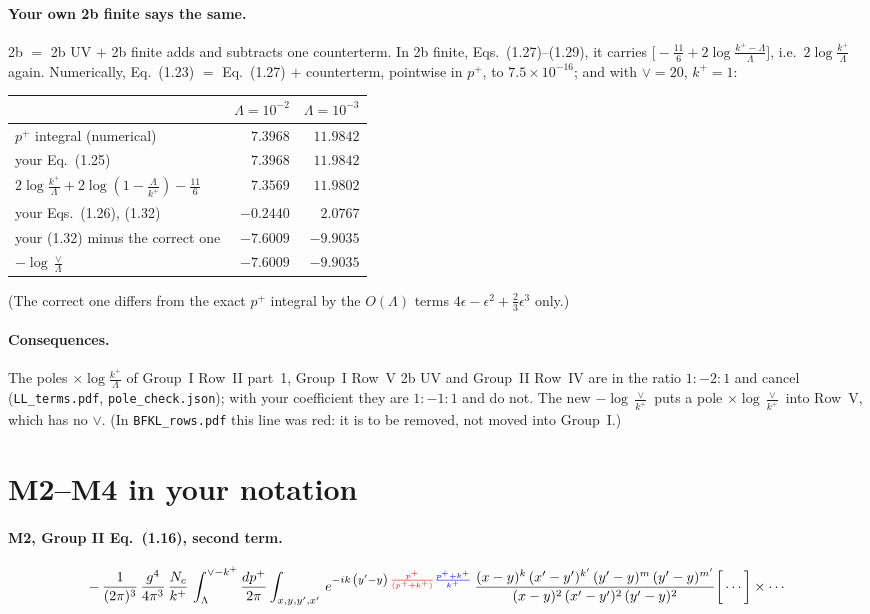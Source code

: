 \documentclass[10pt]{article}
\newcommand{\new}[1]{{\color{blue}#1}}
\newcommand{\old}[1]{{\color{red}#1}}
\begin{document}
\paragraph{Your own 2b finite says the same.} 2b $=$ 2b UV $+$ 2b finite adds and subtracts one counterterm. In 2b finite, Eqs.~(1.27)--(1.29), it carries $\big[-\frac{11}{6}+2\log\frac{k^+-\Lambda}{\Lambda}\big]$, i.e.\ $2\log\frac{k^+}{\Lambda}$ again. Numerically, Eq.~(1.23) $=$ Eq.~(1.27) $+$ counterterm, pointwise in $p^+$, to $7.5\times10^{-16}$; and with $\vee=20$, $k^+=1$:
\begin{center}
\begin{tabular}{lrr}\toprule
 & $\Lambda=10^{-2}$ & $\Lambda=10^{-3}$\\\midrule
$p^+$ integral (numerical) & $7.3968$ & $11.9842$\\
your Eq.~(1.25) & $7.3968$ & $11.9842$\\
$2\log\frac{k^+}{\Lambda}+2\log(1-\frac{\Lambda}{k^+})-\frac{11}{6}$ & $7.3569$ & $11.9802$\\
your Eqs.~(1.26), (1.32) & $-0.2440$ & $2.0767$\\
your (1.32) minus the correct one & $-7.6009$ & $-9.9035$\\
$-\log\frac{\vee}{\Lambda}$ & $-7.6009$ & $-9.9035$\\\bottomrule
\end{tabular}
\end{center}
(The correct one differs from the exact $p^+$ integral by the $O(\Lambda)$ terms $4\epsilon-\epsilon^2+\frac23\epsilon^3$ only.)
\paragraph{Consequences.} The poles $\times\log\frac{k^+}{\Lambda}$ of Group~I Row~II part~1, Group~I Row~V 2b UV and Group~II Row~IV are in the ratio $1:-2:1$ and cancel (\texttt{LL\_terms.pdf}, \texttt{pole\_check.json}); with your coefficient they are $1:-1:1$ and do not. The new $-\log\frac{\vee}{k^+}$ puts a pole $\times\log\frac{\vee}{k^+}$ into Row~V, which has no $\vee$. (In \texttt{BFKL\_rows.pdf} this line was red: it is to be removed, not moved into Group~I.)

\section{M2--M4 in your notation}
\paragraph{M2, Group II Eq.~(1.16), second term.}
\begin{equation*}
-\,\frac{1}{(2\pi)^{3}}\,\frac{g^{4}}{4\pi^{3}}\,\frac{N_{c}}{k^{+}}\,\int_{\Lambda}^{\vee-k^{+}}\frac{dp^{+}}{2\pi}\int_{x,y,y^{\prime},x'}\,e^{-ik\,\left(y'-y\right)\,\old{\frac{p^{+}}{(p^{+}+k^{+})}}\new{\frac{p^{+}+k^{+}}{k^{+}}}}\,\frac{(x-y)^{k}\,(x'-y')^{k'}\,(y'-y)^{m}\,(y'-y)^{m'}}{(x-y)^{2}\,(x'-y')^{2}\,(y'-y)^{2}}\bigg[\cdots\bigg]\times\cdots
\end{equation*}
\end{document}
